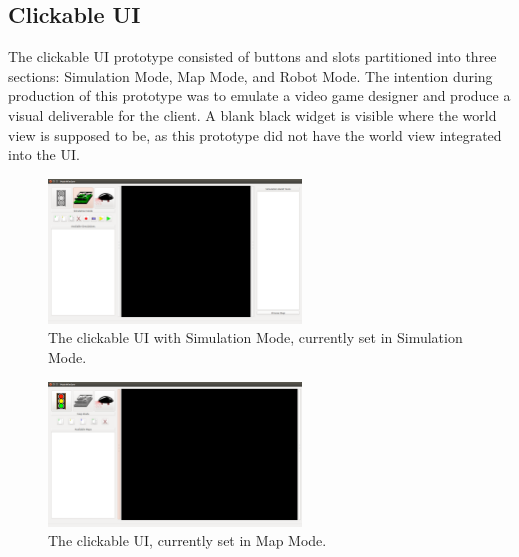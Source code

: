 \subsection{Clickable UI}

The clickable UI prototype consisted of buttons and slots partitioned into three sections: Simulation Mode, Map Mode, and Robot Mode. The intention during production of this prototype was to emulate a video game designer and produce a visual deliverable for the client. A blank black widget is visible where the world view is supposed to be, as this prototype did not have the world view integrated into the UI.\newline\newline\newline
\newline\newline\newline
\newline\newline\newline

\begin{figure}[H]
	\begin{center}
		\includegraphics[width=0.60\textwidth]{./Images/Sprint1_clickableUI_SimulationMode}
	\end{center}
	\caption{The clickable UI with Simulation Mode, currently set in Simulation Mode.  \label{clickableuisimulation}}
\end{figure}

\begin{figure}[H]
	\begin{center}
		\includegraphics[width=0.60\textwidth]{./Images/Sprint1_clickableUI_MapMode}
	\end{center}
	\caption{The clickable UI, currently set in Map Mode. \label{clickableuimap}}
\end{figure}

